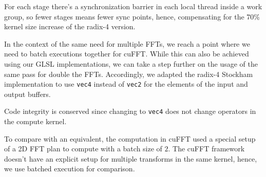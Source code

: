 \documentclass[
  oneside,
  11pt, a4paper,
  footinclude=true,
  headinclude=true,
  cleardoublepage=empty
]{scrbook}
\begin{document}
For each stage there's a synchronization barrier in each local thread inside a work group, so fewer stages means fewer sync points, hence, compensating for the 70\% kernel size increase of the radix-4 version.





In the context of the same need for multiple FFTs, we reach a point where we need to batch executions together for cuFFT. While this can also be achieved using our GLSL implementations, we can take a step further on the usage of the same pass for double the FFTs. Accordingly, we adapted the radix-4 Stockham implementation to use \texttt{vec4} instead of \texttt{vec2} for the elements of the input and output buffers.

Code integrity is conserved since changing to \texttt{vec4} does not change operators in the compute kernel. 

To compare with an equivalent, the computation in cuFFT used a special setup of a 2D FFT plan to compute with a batch size of $2$. The cuFFT framework doesn't have an explicit setup for multiple transforms in the same kernel, hence, we use batched execution for comparison.
\end{document}
